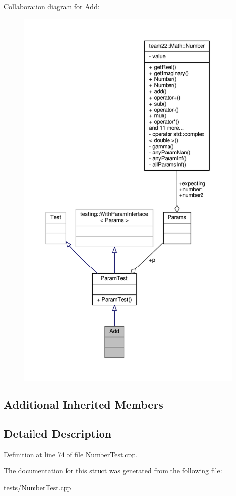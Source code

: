 Collaboration diagram for Add\+:
\nopagebreak
\begin{figure}[H]
\begin{center}
\leavevmode
\includegraphics[height=550pt]{struct_add__coll__graph}
\end{center}
\end{figure}
\subsection*{Additional Inherited Members}


\subsection{Detailed Description}


Definition at line 74 of file Number\+Test.\+cpp.



The documentation for this struct was generated from the following file\+:\begin{DoxyCompactItemize}
\item 
tests/\hyperlink{_number_test_8cpp}{Number\+Test.\+cpp}\end{DoxyCompactItemize}
